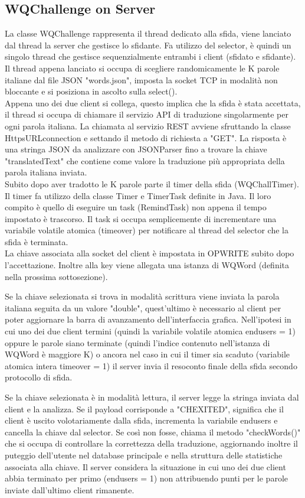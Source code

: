 \documentclass{article}
\begin{document}
\subsection{WQChallenge on Server}
La classe WQChallenge rappresenta il thread dedicato alla sfida, viene lanciato dal thread la server che gestisce lo sfidante. Fa utilizzo del selector, è quindi un singolo thread che gestisce sequenzialmente entrambi i client (sfidato e sfidante). Il thread appena lanciato si occupa di scegliere randomicamente le K parole italiane dal file JSON "words.json", imposta la socket TCP in modalità non bloccante e si posiziona in ascolto sulla select(). \\
Appena uno dei due client si collega, questo implica che la sfida è stata accettata, il thread si occupa di chiamare il servizio API di traduzione singolarmente per ogni parola italiana. La chiamata al servizio REST avviene sfruttando la classe HttpsURLconnection e settando il metodo di richiesta a "GET". La risposta è una stringa JSON da analizzare con JSONParser fino a trovare la chiave "translatedText" che contiene come valore la traduzione più appropriata della parola italiana inviata. \\
Subito dopo aver tradotto le K parole parte il timer della sfida (WQChallTimer). Il timer fa utilizzo della classe Timer e TimerTask definite in Java. Il loro compito è quello di eseguire un task (RemindTask) non appena il tempo impostato è trascorso. Il task si occupa semplicemente di incrementare una variabile volatile atomica (timeover) per notificare al thread del selector che la sfida è terminata.
\\
La chiave associata alla socket del client è impostata in OP\textunderscore WRITE subito dopo l'accettazione. Inoltre alla key viene allegata una istanza di WQWord (definita nella prossima sottosezione). 

Se la chiave selezionata si trova in modalità scrittura viene inviata la parola italiana seguita da un valore "double", quest'ultimo è necessario al client per poter aggiornare la barra di avanzamento dell'interfaccia grafica.
Nell'ipotesi in cui uno dei due client termini (quindi la variabile volatile atomica endusers = 1) oppure le parole siano terminate (quindi l'indice contenuto nell'istanza di WQWord è maggiore K) o ancora nel caso in cui il timer sia scaduto (variabile atomica intera timeover = 1) il server invia il resoconto finale della sfida secondo protocollo di sfida.

Se la chiave selezionata è in modalità lettura, il server legge la stringa inviata dal client e la analizza. Se il payload corrisponde a "CHEXITED", significa che il client è uscito volotariamente dalla sfida, incrementa la variabile endusers e cancella la chiave dal selector. Se così non fosse, chiama il metodo "checkWords()" che si occupa di controllare la correttezza della traduzione, aggiornando inoltre il puteggio dell'utente nel database principale e nella struttura delle statistiche associata alla chiave. Il server considera la situazione in cui uno dei due client abbia terminato per primo (endusers = 1) non attribuendo punti per le parole inviate dall'ultimo client rimanente.
\end{document}
